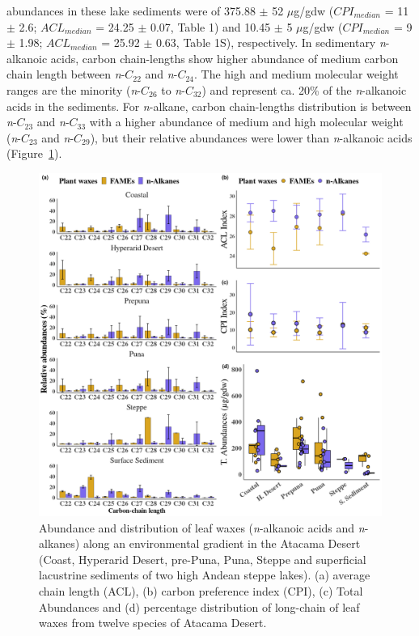 \documentclass[
  authoryear,
  preprint,
  3p]{elsarticle}
\begin{document}
abundances in these lake sediments were of 375.88 \(\pm\) 52
\(\mu\)g/gdw (\(CPI_{median}\) = 11 \(\pm\) 2.6; \(ACL_{median}\) =
24.25 \(\pm\) 0.07, Table 1) and 10.45 \(\pm\) 5 \(\mu\)g/gdw
(\(CPI_{median}\) = 9 \(\pm\) 1.98; \(ACL_{median}\) = 25.92 \(\pm\)
0.63, Table 1S), respectively. In sedimentary \emph{n}-alkanoic acids,
carbon chain-lengths show higher abundance of medium carbon chain length
between \emph{n}-\(C_{22}\) and \emph{n}-\(C_{24}\). The high and medium
molecular weight ranges are the minority (\emph{n}-\(C_{26}\) to
\emph{n}-\(C_{32}\)) and represent ca. 20\% of the \emph{n}-alkanoic
acids in the sediments. For \emph{n}-alkane, carbon chain-lengths
distribution is between \emph{n}-\(C_{23}\) and \emph{n}-\(C_{33}\) with
a higher abundance of medium and high molecular weight
(\emph{n}-\(C_{23}\) and \emph{n}-\(C_{29}\)), but their relative
abundances were lower than \emph{n}-alkanoic acids (Figure~\ref{fig-2}).

\begin{figure}

{\centering \includegraphics{Fig_2.png}

}

\caption{\label{fig-2}Abundance and distribution of leaf waxes
(\emph{n}-alkanoic acids and \emph{n}-alkanes) along an environmental
gradient in the Atacama Desert (Coast, Hyperarid Desert, pre-Puna, Puna,
Steppe and superficial lacustrine sediments of two high Andean steppe
lakes). (a) average chain length (ACL), (b) carbon preference index
(CPI), (c) Total Abundances and (d) percentage distribution of
long-chain of leaf waxes from twelve species of Atacama Desert.}

\end{figure}
\end{document}
